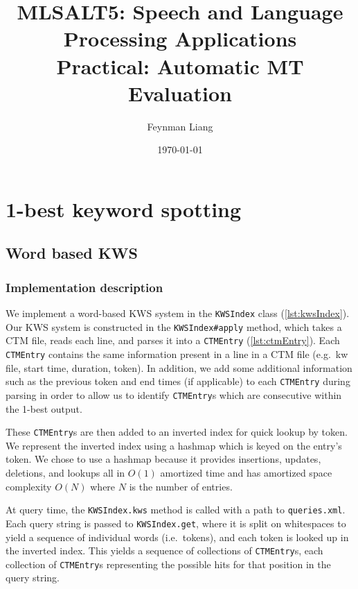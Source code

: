 \documentclass[a4paper,oneside,reqno]{amsart}
\newcommand{\authorname}{Feynman Liang}
\newcommand{\coursename}{MLSALT5: Speech and Language Processing Applications}
\newcommand{\assignmentname}{Practical: Automatic MT Evaluation}
\begin{document}
%

\title{\coursename\\\assignmentname}

\author{\authorname}
\date{\today}

\maketitle

\section{1-best keyword spotting}

\subsection{Word based KWS}

\subsubsection{Implementation description}\label{sec:word-kws-impl}

We implement a word-based KWS system in the \texttt{KWSIndex} class
(\autoref{lst:kwsIndex}).  Our KWS system is constructed in the
\texttt{KWSIndex\#apply} method, which takes a CTM file, reads each line, and
parses it into a \texttt{CTMEntry} (\autoref{lst:ctmEntry}).  Each
\texttt{CTMEntry} contains the same information present in a line in a CTM file
(e.g.\ kw file, start time, duration, token). In addition, we add some
additional information such as the previous token and end times (if applicable)
to each \texttt{CTMEntry} during parsing in order to allow us to identify
\texttt{CTMEntry}s which are consecutive within the 1-best output.

These \texttt{CTMEntry}s are then added to an inverted index for quick lookup
by token. We represent the inverted index using a hashmap which is keyed on the
entry's token.  We chose to use a hashmap because it provides insertions,
updates, deletions, and lookups all in $O(1)$ amortized time and has amortized
space complexity $O(N)$ where $N$ is the number of entries.

At query time, the \texttt{KWSIndex.kws} method is called with a path
to \texttt{queries.xml}. Each query string is passed to \texttt{KWSIndex.get},
where it is split on whitespaces to yield a sequence of individual words (i.e.\ tokens),
and each token is looked up in the inverted index. This yields a sequence of collections
of \texttt{CTMEntry}s, each collection of \texttt{CTMEntry}s representing the possible
hits for that position in the query string.
\end{document}
